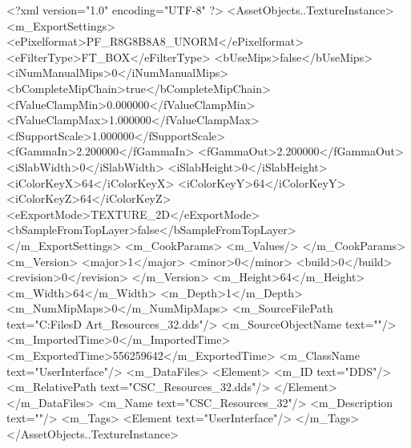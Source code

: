 <?xml version="1.0" encoding="UTF-8" ?>
<AssetObjects..TextureInstance>
	<m_ExportSettings>
		<ePixelformat>PF_R8G8B8A8_UNORM</ePixelformat>
		<eFilterType>FT_BOX</eFilterType>
		<bUseMips>false</bUseMips>
		<iNumManualMips>0</iNumManualMips>
		<bCompleteMipChain>true</bCompleteMipChain>
		<fValueClampMin>0.000000</fValueClampMin>
		<fValueClampMax>1.000000</fValueClampMax>
		<fSupportScale>1.000000</fSupportScale>
		<fGammaIn>2.200000</fGammaIn>
		<fGammaOut>2.200000</fGammaOut>
		<iSlabWidth>0</iSlabWidth>
		<iSlabHeight>0</iSlabHeight>
		<iColorKeyX>64</iColorKeyX>
		<iColorKeyY>64</iColorKeyY>
		<iColorKeyZ>64</iColorKeyZ>
		<eExportMode>TEXTURE_2D</eExportMode>
		<bSampleFromTopLayer>false</bSampleFromTopLayer>
	</m_ExportSettings>
	<m_CookParams>
		<m_Values/>
	</m_CookParams>
	<m_Version>
		<major>1</major>
		<minor>0</minor>
		<build>0</build>
		<revision>0</revision>
	</m_Version>
	<m_Height>64</m_Height>
	<m_Width>64</m_Width>
	<m_Depth>1</m_Depth>
	<m_NumMipMaps>0</m_NumMipMaps>
	<m_SourceFilePath text="C:\Users\Shadow\Desktop\Working Files\2D Art\Resources\CSC_Resources_32.dds"/>
	<m_SourceObjectName text=""/>
	<m_ImportedTime>0</m_ImportedTime>
	<m_ExportedTime>556259642</m_ExportedTime>
	<m_ClassName text="UserInterface"/>
	<m_DataFiles>
		<Element>
			<m_ID text="DDS"/>
			<m_RelativePath text="CSC_Resources_32.dds"/>
		</Element>
	</m_DataFiles>
	<m_Name text="CSC_Resources_32"/>
	<m_Description text=""/>
	<m_Tags>
		<Element text="UserInterface"/>
	</m_Tags>
</AssetObjects..TextureInstance>
